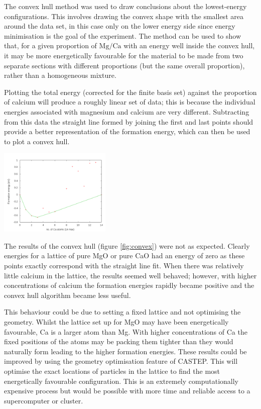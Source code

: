 \documentclass[a4paper,12pt]{article}
\begin{document}
\begin{multicols}{2}
	The convex hull method\cite{jarvis1973identification} was used to draw conclusions about the lowest-energy configurations. This involves drawing the convex shape with the smallest area around the data set, in this case only on the lower energy side since energy minimisation is the goal of the experiment. The method can be used to show that, for a given proportion of $\mathrm{Mg}/\mathrm{Ca}$ with an energy well inside the convex hull, it may be more energetically favourable for the material to be made from two separate sections with different proportions (but the same overall proportion), rather than a homogeneous mixture.
	
	Plotting the total energy (corrected for the finite basis set) against the proportion of calcium will produce a roughly linear set of data; this is because the individual energies associated with magnesium and calcium are very different. Subtracting from this data the straight line formed by joining the first and last points should provide a better representation of the formation energy, which can then be used to plot a convex hull.
    \begin{center}
	    \includegraphics[keepaspectratio=true,width=0.4\textwidth]{convex}
		\label{fig:convex} 
	\end{center}
    The results of the convex hull (figure \ref{fig:convex}) were not as expected.  Clearly energies for a lattice of pure MgO or pure CaO had an energy of zero as these points exactly correspond with the straight line fit. When there was relatively little calcium in the lattice, the results seemed well behaved; however, with higher concentrations of calcium the formation energies rapidly became positive and the convex hull algorithm became less useful.   
    
    This behaviour could be due to setting a fixed lattice and not optimising the geometry. Whilst the lattice set up for MgO may have been energetically favourable, Ca is a larger atom than Mg. With higher concentrations of Ca the fixed positions of the atoms may be packing them tighter than they would naturally form leading to the higher formation energies. These results could be improved by using the geometry optimisation feature of CASTEP. This will optimise the exact locations of particles in the lattice to find the most energetically favourable configuration. This is  an extremely computationally expensive process but would be possible with more time and reliable access to a supercomputer or cluster.
    

\end{multicols}
\end{document}
